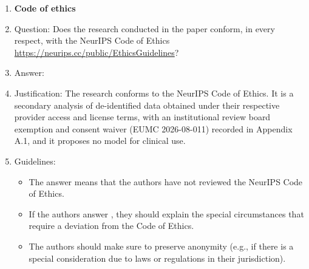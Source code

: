 \begin{enumerate}
\item {\bf Code of ethics}
    \item[] Question: Does the research conducted in the paper conform, in every respect, with the NeurIPS Code of Ethics \url{https://neurips.cc/public/EthicsGuidelines}?
    \item[] Answer: \answerYes{}
    \item[] Justification: The research conforms to the NeurIPS Code of Ethics. It is a secondary analysis of de-identified data obtained under their respective provider access and license terms, with an institutional review board exemption and consent waiver (EUMC 2026-08-011) recorded in Appendix A.1, and it proposes no model for clinical use.
    \item[] Guidelines:
    \begin{itemize}
        \item The answer \answerNA{} means that the authors have not reviewed the NeurIPS Code of Ethics.
        \item If the authors answer \answerNo, they should explain the special circumstances that require a deviation from the Code of Ethics.
        \item The authors should make sure to preserve anonymity (e.g., if there is a special consideration due to laws or regulations in their jurisdiction).
    \end{itemize}



\end{enumerate}
